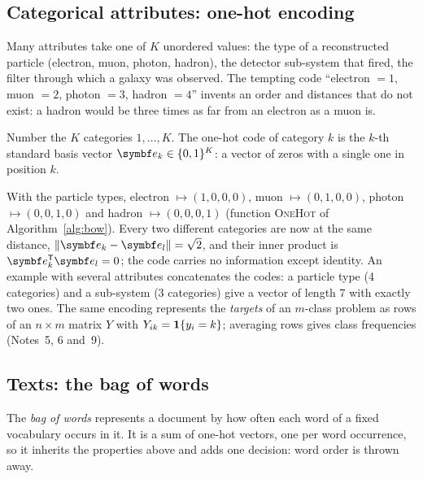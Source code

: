 \documentclass[11pt]{article}
\begin{document}
\subsection{Categorical attributes: one-hot encoding}\label{sec:onehot}

Many attributes take one of $K$ unordered values: the type of a reconstructed particle (electron, muon, photon,
hadron), the detector sub-system that fired, the filter through which a galaxy was observed. The tempting code
``electron $= 1$, muon $= 2$, photon $= 3$, hadron $= 4$'' invents an order and distances that do not exist: a
hadron would be three times as far from an electron as a muon is.

\begin{definition}
Number the $K$ categories $1, \dots, K$. The one-hot code of category $k$ is the $k$-th standard basis vector
$\vect{e}_k \in \{0, 1\}^K$: a vector of zeros with a single one in position $k$.
\end{definition}

With the particle types, electron $\mapsto (1,0,0,0)$, muon $\mapsto (0,1,0,0)$, photon $\mapsto (0,0,1,0)$ and hadron
$\mapsto (0,0,0,1)$ (function \textsc{OneHot} of Algorithm~\ref{alg:bow}). Every two different categories are now at the same distance, $\norm{\vect{e}_k - \vect{e}_l} =
\sqrt{2}$, and their inner product is $\vect{e}_k\T\vect{e}_l = 0$; the code carries no information except identity.
An example with several attributes concatenates the codes: a particle type (4 categories) and a sub-system
(3 categories) give a vector of length 7 with exactly two ones. The same encoding represents the \emph{targets} of an
$m$-class problem as rows of an $n \times m$ matrix $Y$ with $Y_{ik} = \mathbf{1}\!\left\{y_i = k\right\}$; averaging rows gives class
frequencies (Notes~5, 6 and~9).

\subsection{Texts: the bag of words}\label{sec:bow}

The \emph{bag of words} represents a document by how often each word of a fixed vocabulary occurs in it. It is a sum
of one-hot vectors, one per word occurrence, so it inherits the properties above and adds one decision: word order
is thrown away.
\end{document}
